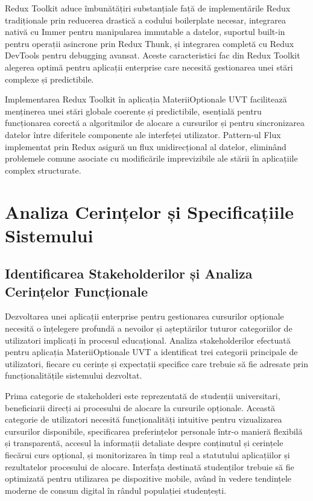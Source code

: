 \documentclass[12pt,a4paper]{report}
\begin{document}
Redux Toolkit aduce îmbunătățiri substanțiale față de implementările Redux tradiționale prin reducerea drastică a codului boilerplate necesar, integrarea nativă cu Immer pentru manipularea immutable a datelor, suportul built-in pentru operații asincrone prin Redux Thunk, și integrarea completă cu Redux DevTools pentru debugging avansat. Aceste caracteristici fac din Redux Toolkit alegerea optimă pentru aplicații enterprise care necesită gestionarea unei stări complexe și predictibile.

Implementarea Redux Toolkit în aplicația MateriiOptionale UVT facilitează menținerea unei stări globale coerente și predictibile, esențială pentru funcționarea corectă a algoritmilor de alocare a cursurilor și pentru sincronizarea datelor între diferitele componente ale interfeței utilizator. Pattern-ul Flux implementat prin Redux asigură un flux unidirecțional al datelor, eliminând problemele comune asociate cu modificările imprevizibile ale stării în aplicațiile complex structurate.

\chapter{Analiza Cerințelor și Specificațiile Sistemului}

\section{Identificarea Stakeholderilor și Analiza Cerințelor Funcționale}

Dezvoltarea unei aplicații enterprise pentru gestionarea cursurilor opționale necesită o înțelegere profundă a nevoilor și așteptărilor tuturor categoriilor de utilizatori implicați în procesul educațional. Analiza stakeholderilor efectuată pentru aplicația MateriiOptionale UVT a identificat trei categorii principale de utilizatori, fiecare cu cerințe și expectații specifice care trebuie să fie adresate prin funcționalitățile sistemului dezvoltat.

Prima categorie de stakeholderi este reprezentată de studenții universitari, beneficiarii direcți ai procesului de alocare la cursurile opționale. Această categorie de utilizatori necesită funcționalități intuitive pentru vizualizarea cursurilor disponibile, specificarea preferințelor personale într-o manieră flexibilă și transparentă, accesul la informații detaliate despre conținutul și cerințele fiecărui curs opțional, și monitorizarea în timp real a statutului aplicațiilor și rezultatelor procesului de alocare. Interfața destinată studenților trebuie să fie optimizată pentru utilizarea pe dispozitive mobile, având în vedere tendințele moderne de consum digital în rândul populației studențești.
\end{document}
